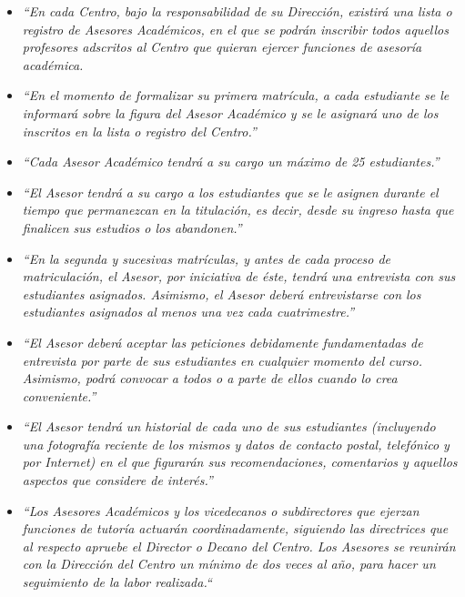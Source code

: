\begin{itemize}
   \item \textit{``En cada Centro, bajo la responsabilidad de su Dirección,
   existirá una lista o registro de Asesores Académicos, en el que se podrán
   inscribir todos aquellos profesores adscritos al Centro que quieran ejercer
   funciones de asesoría académica.}
   \item \textit{``En el momento de formalizar su primera matrícula, a cada
   estudiante se le informará sobre la figura del Asesor Académico y se le
   asignará uno de los inscritos en la lista o registro del Centro.''}
   \item \textit{``Cada Asesor Académico tendrá a su cargo un máximo de 25
   estudiantes.''}
   \item \textit{``El Asesor tendrá a su cargo a los estudiantes que se le
   asignen durante el tiempo que permanezcan en la titulación, es decir, desde
   su ingreso hasta que finalicen sus estudios o los abandonen.''}
   \item \textit{``En la segunda y sucesivas matrículas, y antes de cada proceso
   de matriculación, el Asesor, por iniciativa de éste, tendrá una entrevista
   con sus estudiantes asignados. Asimismo, el Asesor deberá entrevistarse con
   los estudiantes asignados al menos una vez cada cuatrimestre.''}
   \item \textit{``El Asesor deberá aceptar las peticiones debidamente
   fundamentadas de entrevista por parte de sus estudiantes en cualquier momento
   del curso. Asimismo, podrá convocar a todos o a parte de ellos cuando lo crea
   conveniente.''}
   \item \textit{``El Asesor tendrá un historial de cada uno de sus estudiantes
   (incluyendo una fotografía reciente de los mismos y datos de contacto postal,
   telefónico y por Internet) en el que figurarán sus recomendaciones,
   comentarios y aquellos aspectos que considere de interés.''}

   \item \textit{``Los Asesores Académicos y los vicedecanos o
   subdirectores que ejerzan funciones de tutoría actuarán coordinadamente,
   siguiendo las directrices que al respecto apruebe el Director o Decano del
   Centro. Los Asesores se reunirán con la Dirección del Centro un mínimo de dos
   veces al año, para hacer un seguimiento de la labor realizada.``}

\end{itemize}